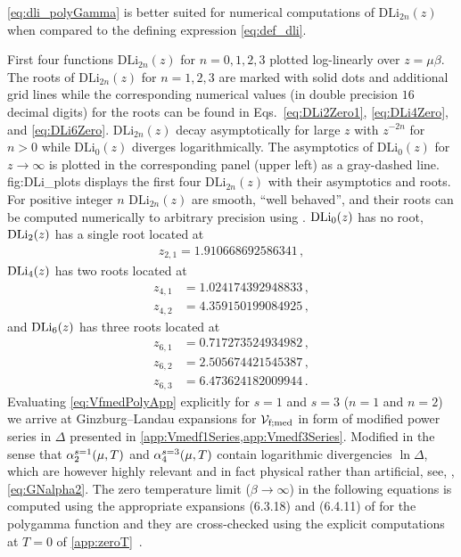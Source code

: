 \cref{eq:dli_polyGamma} is better suited for numerical computations of $\mathrm{DLi}_{2n} ( z ) $ when compared to the defining expression \eqref{eq:def_dli}.

%
	{%
		First four functions $\mathrm{DLi}_{2n}(z)$ for $n=0,1,2,3$ plotted log-linearly over $z=\mu \beta$.
		The roots of $\mathrm{DLi}_{2n}(z)$ for $n=1,2,3$ are marked with solid dots and additional grid lines while the corresponding numerical values (in double precision \dash{} $16$ decimal digits) for the roots can be found in Eqs.~\eqref{eq:DLi2Zero1}, \eqref{eq:DLi4Zero}, and \eqref{eq:DLi6Zero}.
		$\mathrm{DLi}_{2n}(z)$ decay asymptotically for large $z$ with $z^{-2n}$ for $n>0$ while $\mathrm{DLi}_{0}(z)$ diverges logarithmically.
		The asymptotics of $\mathrm{DLi}_{0}(z)$ for $z\rightarrow\infty$ is plotted in the corresponding panel (upper left) as a gray-dashed line.
	}%
	{fig:DLi_plots}
 displays the first four $\mathrm{DLi}_{2n} ( z )$ with their asymptotics and roots.
For positive integer $n$ $\mathrm{DLi}_{2n} ( z ) $ are smooth, ``well behaved'', and their roots can be computed numerically to arbitrary precision using \WAMwR{}.
$\operatorname{DLi}_{0} ( z ) $ has no root, $\operatorname{DLi}_{2} ( z ) $ has a single root located at
\begin{align}
	z_{2,1}=1.910668692586341\,,\label{eq:DLi2Zero1}
\end{align}
$\operatorname{DLi}_{4} ( z )$ has two roots located at
\begin{subequations}\label{eq:DLi4Zero}
\begin{align}
	z_{4,1}&=1.024174392948833\,,\label{eq:DLi4Zero1}\\
	z_{4,2}&=4.359150199084925\,,\label{eq:DLi4Zero2}
\end{align}
\end{subequations}
and $\operatorname{DLi}_{6} ( z ) $ has three roots located at
\begin{subequations}\label{eq:DLi6Zero}
\begin{align}
	z_{6,1}&=0.717273524934982\,,\label{eq:DLi6Zero1}\\
	z_{6,2}&=2.505674421545387\,,\label{eq:DLi6Zero2}\\
	z_{6,3}&=6.473624182009944\,.\label{eq:DLi6Zero3}
\end{align}
\end{subequations}
Evaluating \cref{eq:VfmedPolyApp} explicitly for $s=1$ and $s=3$ ($n=1$ and $n=2$) we arrive at Ginzburg–Landau expansions for $\mathcal{V}_{\mathrm{f};\mathrm{med}}$
in form of modified power series in $\Delta$ presented in \cref{app:Vmedf1Series,app:Vmedf3Series}.
Modified in the sense that $\alpha_2^{s=1}(\muT)$ and $\alpha_4^{s=3}(\muT)$ contain logarithmic divergencies $\ln{\Delta}$, which are however highly relevant and in fact physical rather than artificial, see, \eg{}, \cref{eq:GNalpha2}.
The zero temperature limit ($\beta\rightarrow\infty$) in the following equations is computed using the appropriate expansions (6.3.18) and (6.4.11) of  for the polygamma function and they are cross-checked using the explicit computations at $T=0$ of \cref{app:zeroT}~\cite{Steil:2023PhDThermodynamicsNB}.

